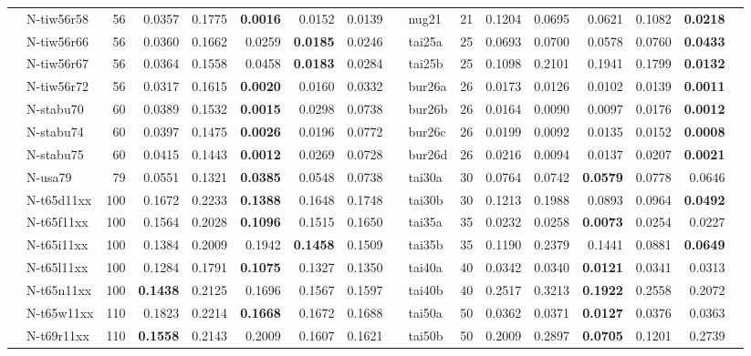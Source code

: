 \documentclass[conference]{IEEEtran}
\begin{document}
\begin{table}[hbt]
{\begin{tabular}{clrrrrrr | clrrrrrrr}
 & N-tiw56r58 & 56 & 0.0357 & 0.1775 & {\bf 0.0016} & 0.0152 & 0.0139 &  & nug21 & 21 & 0.1204 & 0.0695 & 0.0621 & 0.1082 & {\bf 0.0218}\\
 & N-tiw56r66 & 56 & 0.0360 & 0.1662 & 0.0259 & {\bf 0.0185} & 0.0246 &  & tai25a & 25 & 0.0693 & 0.0700 & 0.0578 & 0.0760 & {\bf 0.0433}\\
 & N-tiw56r67 & 56 & 0.0364 & 0.1558 & 0.0458 & {\bf 0.0183} & 0.0284 &  & tai25b & 25 & 0.1098 & 0.2101 & 0.1941 & 0.1799 & {\bf 0.0132}\\
 & N-tiw56r72 & 56 & 0.0317 & 0.1615 & {\bf 0.0020} & 0.0160 & 0.0332 &  & bur26a & 26 & 0.0173 & 0.0126 & 0.0102 & 0.0139 & {\bf 0.0011}\\
 & N-stabu70 & 60 & 0.0389 & 0.1532 & {\bf 0.0015} & 0.0298 & 0.0738 &  & bur26b & 26 & 0.0164 & 0.0090 & 0.0097 & 0.0176 & {\bf 0.0012}\\
 & N-stabu74 & 60 & 0.0397 & 0.1475 & {\bf 0.0026} & 0.0196 & 0.0772 &  & bur26c & 26 & 0.0199 & 0.0092 & 0.0135 & 0.0152 & {\bf 0.0008}\\
 & N-stabu75 & 60 & 0.0415 & 0.1443 & {\bf 0.0012} & 0.0269 & 0.0728 &  & bur26d & 26 & 0.0216 & 0.0094 & 0.0137 & 0.0207 & {\bf 0.0021}\\
 & N-usa79 & 79 & 0.0551 & 0.1321 & {\bf 0.0385} & 0.0548 & 0.0738 &  & tai30a & 30 & 0.0764 & 0.0742 & {\bf 0.0579} & 0.0778 & 0.0646\\
 & N-t65d11xx & 100 & 0.1672 & 0.2233 & {\bf 0.1388} & 0.1648 & 0.1748 &  & tai30b & 30 & 0.1213 & 0.1988 & 0.0893 & 0.0964 & {\bf 0.0492}\\
 & N-t65f11xx & 100 & 0.1564 & 0.2028 & {\bf 0.1096} & 0.1515 & 0.1650 &  & tai35a & 35 & 0.0232 & 0.0258 & {\bf 0.0073} & 0.0254 & 0.0227\\
 & N-t65i11xx & 100 & 0.1384 & 0.2009 & 0.1942 & {\bf 0.1458} & 0.1509 &  & tai35b & 35 & 0.1190 & 0.2379 & 0.1441 & 0.0881 & {\bf 0.0649}\\
 & N-t65l11xx & 100 & 0.1284 & 0.1791 & {\bf 0.1075} & 0.1327 & 0.1350 &  & tai40a & 40 & 0.0342 & 0.0340 & {\bf 0.0121} & 0.0341 & 0.0313\\
 & N-t65n11xx & 100 & {\bf 0.1438} & 0.2125 & 0.1696 & 0.1567 & 0.1597 &  & tai40b & 40 & 0.2517 & 0.3213 & {\bf 0.1922} & 0.2558 & 0.2072\\
 & N-t65w11xx & 110 & 0.1823 & 0.2214 & {\bf 0.1668} & 0.1672 & 0.1688 &  & tai50a & 50 & 0.0362 & 0.0371 & {\bf 0.0127} & 0.0376 & 0.0363\\
 & N-t69r11xx & 110 & {\bf 0.1558} & 0.2143 & 0.2009 & 0.1607 & 0.1621 &  & tai50b & 50 & 0.2009 & 0.2897 & {\bf 0.0705} & 0.1201 & 0.2739\\

\end{tabular}}
\end{table}
\end{document}
